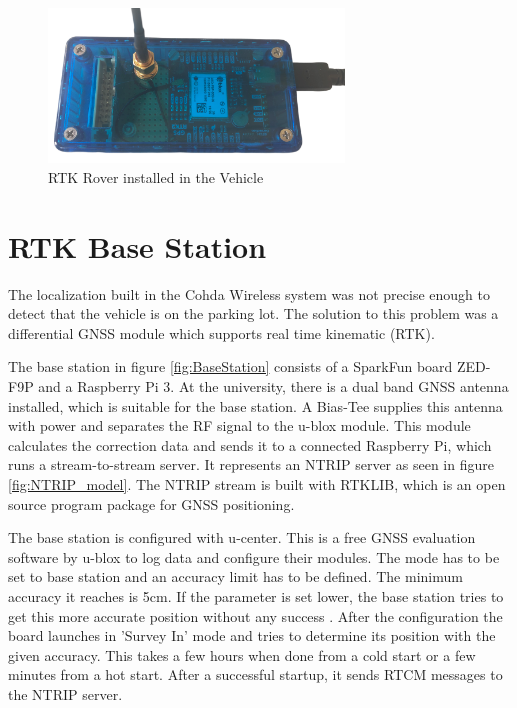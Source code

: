 \begin{figure}[htb]
	\centering
	\includegraphics[width=0.7\textwidth]{images/RTK-Rover}
	\caption{RTK Rover installed in the Vehicle}
	\label{fig:RTKRover}
\end{figure}

\newpage

\section{RTK Base Station} \label{sec:rtkBase}

The localization built in the Cohda Wireless system was not precise enough to detect that the vehicle is on the parking lot. The solution to this problem was a differential GNSS module which supports real time kinematic (RTK). \cite{WsCommScript}

The base station in figure \ref{fig:BaseStation} consists of a SparkFun board ZED-F9P and a Raspberry Pi 3. At the university, there is a dual band GNSS antenna installed, which is suitable for the base station. A Bias-Tee supplies this antenna with power and separates the RF signal to the u-blox module. This module calculates the correction data and sends it to a connected Raspberry Pi, which runs a stream-to-stream server. It represents an NTRIP server as seen in figure \ref{fig:NTRIP_model}. The NTRIP stream is built with RTKLIB, which is an open source program package for GNSS positioning. \cite{RTKLIB}

The base station is configured with u-center. This is a free GNSS evaluation software by u-blox to log data and configure their modules. The mode has to be set to base station and an accuracy limit has to be defined. The minimum accuracy it reaches is 5\;cm. If the parameter is set lower, the base station tries to get this more accurate position without any success \cite{ZED-F9P-IntegrationManual}.
After the configuration the board launches in 'Survey In' mode and tries to determine its position with the given accuracy. This takes a few hours when done from a cold start or a few minutes from a hot start. After a successful startup, it sends RTCM messages to the NTRIP server. \cite{NTRIP_RPi}


